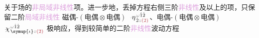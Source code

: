 关于场的\textcolor{Plum}{非局域}\textcolor{Plum}{非线性}项。进一步地，丢掉方程右侧三阶\textcolor{Plum}{非线性}及以上的项，只保留二阶\textcolor{Plum}{局域}\textcolor{Plum}{非线性} \textcolor{NavyBlue}{磁偶-$(\text{电偶}\otimes\text{电偶})$} $\Xint{\begin{smallmatrix} ~ \\ {}^{}_{\mathcolor{gray}{-}} \\ ~ \end{smallmatrix}}{17}{\eta}^{\;\! \mathcolor{gray}{\omega} \hat{1} \hat{2}}_{\;\! \dot{2} \mathcolor{gray}{z} \textcolor{Maroon}{(2)}}$、\textcolor{NavyBlue}{电偶-$(\text{电偶}\otimes\text{电偶})$} $\Xint{{}^{}_{\mathcolor{gray}{-}}}{23}{\chi}^{\;\! \mathcolor{gray}{\omega} \hat{1} \hat{2}}_{\;\! \symup{\iota} \mathcolor{gray}{z} \textcolor{Maroon}{(2)}}$ 极响应，得到较简单的二阶\textcolor{Plum}{非线性}波动方程
